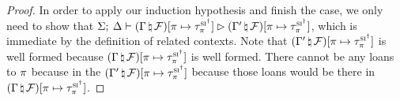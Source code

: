 \begin{proof}
  \vspace{1em}
  \noindent {} \vspace{1em}

  In order to apply our induction hypothesis and finish the case, we only need
  to show that
  $\Sigma; \: \Delta \vdash (\Gamma \, \natural \, \mathcal{F})[\pi
    \mapsto
    \tau^{\textsc{si}^\dagger}_\pi] \rhd (\Gamma^\prime \, \natural \, \mathcal{F})[\pi
    \mapsto \tau^{\textsc{si}^\dagger}_\pi]$, which is immediate by the definition of
  related contexts. Note that
  $(\Gamma^\prime \, \natural \, \mathcal{F})[\pi \mapsto
  \tau^{\textsc{si}^\dagger}_\pi]$ is well formed because
  $(\Gamma \, \natural \, \mathcal{F})[\pi \mapsto \tau^{\textsc{si}^\dagger}_\pi]$ is
  well formed. There cannot be any loans to $\pi$ because in the
  $(\Gamma^\prime \, \natural \, \mathcal{F})[\pi \mapsto
  \tau^{\textsc{si}^\dagger}_\pi]$ because those loans would be there in
  $(\Gamma \, \natural \, \mathcal{F})[\pi \mapsto \tau^{\textsc{si}^\dagger}_\pi]$.


\end{proof}
